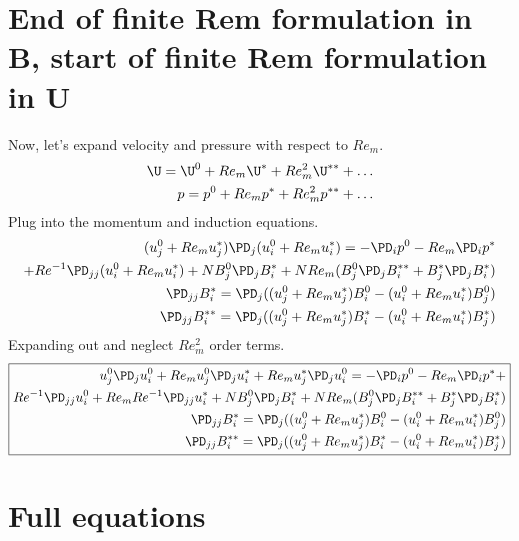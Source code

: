\documentclass[11pt]{article}
\begin{document}
\section{End of finite Rem formulation in B, start of finite Rem formulation in U}
Now, let's expand velocity and pressure with respect to $Re_m$.
\begin{equation}\begin{aligned}
	\U = \U^0 + Re_m \U^* + Re_m^2 \U^{**} + \hdots \\
	p = p^0 + Re_m p^* + Re_m^2 p^{**} + \hdots
\end{aligned} \end{equation}
Plug into the momentum and induction equations.
\begin{equation}\begin{aligned}
(u_j^0+Re_m u_j^*)\PD_j (u_i^0+Re_m u_i^*) =-\PD_i p^0-Re_m\PD_i p^* \\ + Re^{-1} \PD_{jj} (u_i^0+Re_m u_i^*) + N B_j^0 \PD_j B_i^* + N Re_m ( B_j^0 \PD_j B_i^{**} + B_j^* \PD_j B_i^* ) \\
\PD_{jj} B_i^{*}  = \PD_j ((u_j^0+Re_m u_j^*) B_i^{0} - (u_i^0+Re_m u_i^*) B_j^{0}) \\
\PD_{jj} B_i^{**} = \PD_j ((u_j^0+Re_m u_j^*) B_i^{*} - (u_i^0+Re_m u_i^*) B_j^{*}) \\
\end{aligned}\end{equation}
Expanding out and neglect $Re_m^2$ order terms.
\begin{equation}\boxed{\begin{aligned}
u_j^0 \PD_j u_i^0 + Re_m u_j^0 \PD_j u_i^* + Re_m u_j^* \PD_j u_i^0 = -\PD_i p^0 - Re_m\PD_i p^*+  \\
Re^{-1} \PD_{jj} u_i^0 + Re_m Re^{-1} \PD_{jj} u_i^*
+ N B_j^0 \PD_j B_i^* + N Re_m ( B_j^0 \PD_j B_i^{**} + B_j^* \PD_j B_i^* )
\\
\PD_{jj} B_i^{*}  = \PD_j ((u_j^0+Re_m u_j^*) B_i^{0} - (u_i^0+Re_m u_i^*) B_j^{0}) \\
\PD_{jj} B_i^{**} = \PD_j ((u_j^0+Re_m u_j^*) B_i^{*} - (u_i^0+Re_m u_i^*) B_j^{*}) \\
\end{aligned}}\end{equation}

\section{Full equations}
\end{document}
